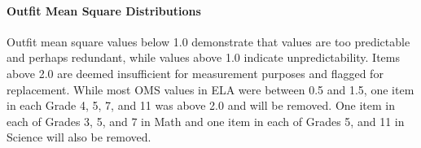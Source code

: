 \documentclass[]{article}
\let\oldparagraph\paragraph
\renewcommand{\paragraph}[1]{\oldparagraph{#1}\mbox{}}
\begin{document}
\hypertarget{outfit-mean-square-distributions}{%
\paragraph{Outfit Mean Square
Distributions}\label{outfit-mean-square-distributions}}

Outfit mean square values below 1.0 demonstrate that values are too
predictable and perhaps redundant, while values above 1.0 indicate
unpredictability. Items above 2.0 are deemed insufficient for
measurement purposes and flagged for replacement. While most OMS values
in ELA were between 0.5 and 1.5, one item in each Grade 4, 5, 7, and 11
was above 2.0 and will be removed. One item in each of Grades 3, 5, and
7 in Math and one item in each of Grades 5, and 11 in Science will also
be removed.
\end{document}
